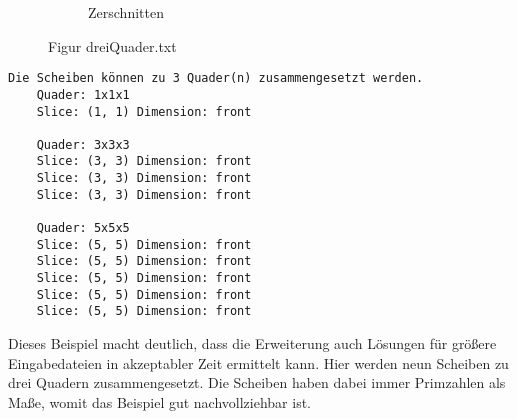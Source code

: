 \documentclass[a4paper,10pt,ngerman]{scrartcl}
\newcommand{\simplecube}[8]%
{
    \begin{scope}[shift={#1}]
        \fill[gray!40,canvas is yz plane at x=#2, opacity=#8] (0,0) rectangle (#3,#4);
        \fill[gray!10,canvas is xz plane at y=#3, opacity=#8] (0,0) rectangle (#2,#4);
        \fill[white  ,canvas is xy plane at z=#4, opacity=#8] (0,0) rectangle (#2,#3);
        \foreach\i/\j in {0/1, 1/1, 1/0}
            {
            \draw[line#5] (0,#3*\i,#4*\j) --++ (#2,0,0);
            \draw[line#6] (#2*\i,0,#4*\j) --++ (0,#3,0);
            \draw[line#7] (#2*\i,#3*\j,0) --++ (0,0,#4);
        }
    \end{scope}
}
\begin{document}
\begin{figure}[H]
\begin{subfigure}[b]{0.45\textwidth}
\begin{tikzpicture}[3d view={115}{30},line cap=round,line join=round,scale=0.4]
            \end{tikzpicture}
            \caption{Zerschnitten}\label{fig:figB4}
        \end{subfigure}
        \caption{Figur dreiQuader.txt}
        \label{fig:figAB4}
    \end{figure}

    \begin{lstlisting}[frame=single, title=Programmausgabe dreiQuader.txt, breaklines=true,label={lst:lstlisting5}]
    Die Scheiben können zu 3 Quader(n) zusammengesetzt werden.
    Quader: 1x1x1
    Slice: (1, 1) Dimension: front

    Quader: 3x3x3
    Slice: (3, 3) Dimension: front
    Slice: (3, 3) Dimension: front
    Slice: (3, 3) Dimension: front

    Quader: 5x5x5
    Slice: (5, 5) Dimension: front
    Slice: (5, 5) Dimension: front
    Slice: (5, 5) Dimension: front
    Slice: (5, 5) Dimension: front
    Slice: (5, 5) Dimension: front
    \end{lstlisting}

    Dieses Beispiel macht deutlich, dass die Erweiterung auch Lösungen für größere Eingabedateien in akzeptabler Zeit ermittelt kann.
    Hier werden neun Scheiben zu drei Quadern zusammengesetzt.
    Die Scheiben haben dabei immer Primzahlen als Maße, womit das Beispiel gut nachvollziehbar ist.
\end{document}
